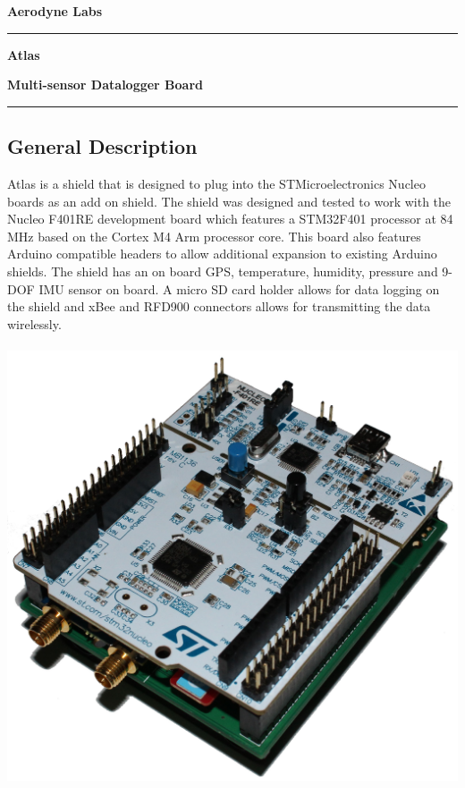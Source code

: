 \documentclass[letterpaper,twoside]{article}
\newcommand{\productName}{Atlas}
\newcommand{\productTeaser}{Multi-sensor Datalogger Board}
\newcommand{\companyName}{Aerodyne Labs}
\begin{document}
\thispagestyle{plain} %
\textsf{\textbf{\Large{\companyName}}}\\
\rule{\linewidth}{2pt}
\vspace{8pt}
\par\textsf{\textbf{\Huge{\productName}}}
\vspace{16pt}
\par\textsf{\textbf{\Large{\productTeaser}}}
\vspace{8pt}\\
\rule{\linewidth}{1pt}
\vspace{8pt}

\begin{multicols}{2}

\section*{General Description}
Atlas is a shield that is designed to plug into the STMicroelectronics Nucleo boards as an add on shield.  The shield was designed and tested to work with the Nucleo F401RE development board which features a STM32F401 processor at 84 MHz based on the Cortex M4 Arm processor core.  This board also features Arduino compatible headers to allow additional expansion to existing Arduino shields.  The shield has an on board GPS, temperature, humidity, pressure and 9-DOF IMU sensor on board.  A micro SD card holder allows for data logging on the shield and xBee and RFD900 connectors allows for transmitting the data wirelessly.  
\ \\ \ \\

\includegraphics[scale=.06]{images/Atlas.jpg}



\end{multicols}
\end{document}
